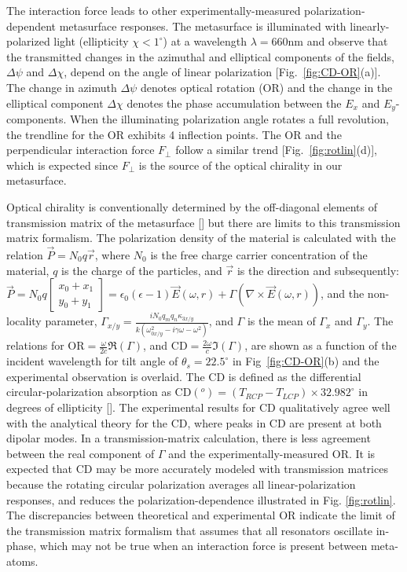 The interaction force leads to other experimentally-measured polarization-dependent metasurface responses.  
The metasurface is illuminated with linearly-polarized light (ellipticity $\chi< 1 ^\circ$) at a wavelength $\lambda = 660$nm and observe that the transmitted changes in the azimuthal and elliptical components of the fields, $\Delta \psi$ and $\Delta \chi$, depend on the angle of linear polarization [Fig.~\ref{fig:CD-OR}(a)]. The change in azimuth $\Delta \psi$ denotes optical rotation (OR) and the change in the elliptical component $\Delta \chi$ denotes the phase accumulation between the $E_x$ and $E_y$-components. When the illuminating polarization angle rotates a full revolution, the trendline for the OR exhibits 4 inflection points. The OR and the perpendicular interaction force $F_\perp$ follow a similar trend [Fig.~\ref{fig:rotlin}(d)], which is expected since $F_\perp$ is the source of the optical chirality in our metasurface.  

Optical chirality is conventionally determined by the off-diagonal elements of transmission matrix of the metasurface  [\cite{Wu16, Plum14,Plum11}] but there are limits to this transmission matrix formalism. The polarization density of the material is calculated with the relation $\vec{P} = N_0q\vec{r}$, where $N_0$ is the free charge carrier concentration of the material, $q$ is the charge of the particles, and $\vec{r}$ is the direction and subsequently:
$\vec{P} = N_0q\begin{bmatrix}
x_0+x_1\\y_0+y_1
\end{bmatrix} = \epsilon_0(\epsilon-1)\vec{E}(\omega, r)+\Gamma(\nabla\times\vec{E}(\omega,r))$, and the non-locality parameter, $\Gamma_{x/y} = \frac{iN_0q_mq_n\kappa_{3x/y}}{k(\omega_{0x/y}^2-i\gamma\omega-\omega^2)}$, and $\Gamma$ is the mean of $\Gamma_x$ and $\Gamma_y$. The relations for OR$ =\frac{\omega}{2c}\Re(\Gamma) $, and CD$ = \frac{2\omega}{c}\Im(\Gamma)$, are shown as a function of the incident wavelength for tilt angle of $\theta_s = 22.5^\circ$ in Fig~\ref{fig:CD-OR}(b) and the experimental observation is overlaid. The CD is defined as the differential circular-polarization absorption as CD$(^o) = (T_{RCP}-T_{LCP})\times 32.982^\circ$ in degrees of ellipticity [\cite{Barron}]. The experimental results for CD qualitatively agree well with the analytical theory for the CD, where peaks in CD are present at both dipolar modes. In a transmission-matrix calculation, there is less agreement between the real component of $\Gamma$ and the experimentally-measured OR. It is expected that CD may be more accurately modeled with transmission matrices because the rotating circular polarization averages all linear-polarization responses, and reduces the polarization-dependence illustrated in Fig. \ref{fig:rotlin}. The discrepancies between theoretical and experimental OR indicate the limit of the transmission matrix formalism that assumes that all resonators oscillate in-phase, which may not be true when an interaction force is present between meta-atoms.

